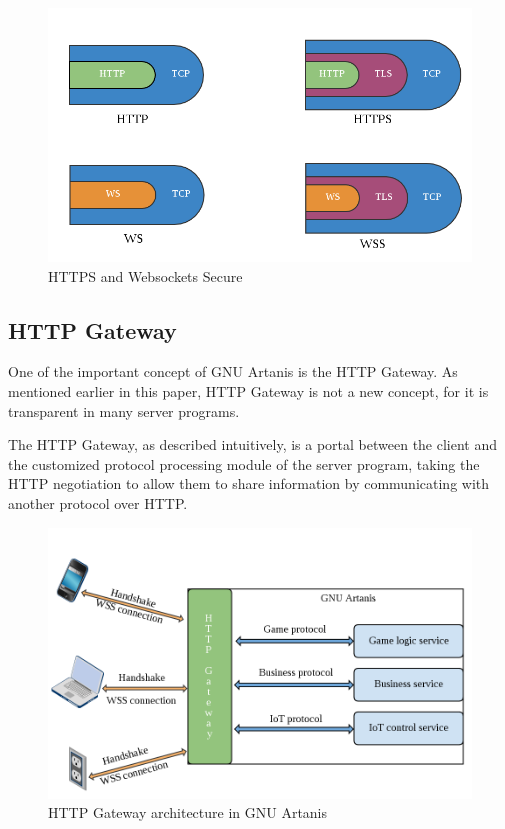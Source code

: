 \documentclass[numbers,numberedpars]{sigplanconf}
\begin{document}
\begin{figure}[tbph]
  \centering
  \label{fig:wss}
  \includegraphics[scale=0.3]{wss.png}
  \caption{HTTPS and Websockets Secure}
\end{figure}

\subsection{HTTP Gateway} \label{HTTP Gateway}

One of the important concept of GNU Artanis is the HTTP Gateway. As mentioned earlier in this paper, HTTP Gateway is not a new concept, for it is transparent in many server programs.

The HTTP Gateway, as described intuitively, is a portal between the client and the customized protocol processing module of the server program, taking the HTTP negotiation to allow them to share information by communicating with another protocol over HTTP.

\begin{figure}[tbph]
  \centering
  \includegraphics[scale=0.25]{httpgw.png}
  \caption{HTTP Gateway architecture in GNU Artanis}
  \label{fig:httpgw}
\end{figure}
\end{document}
